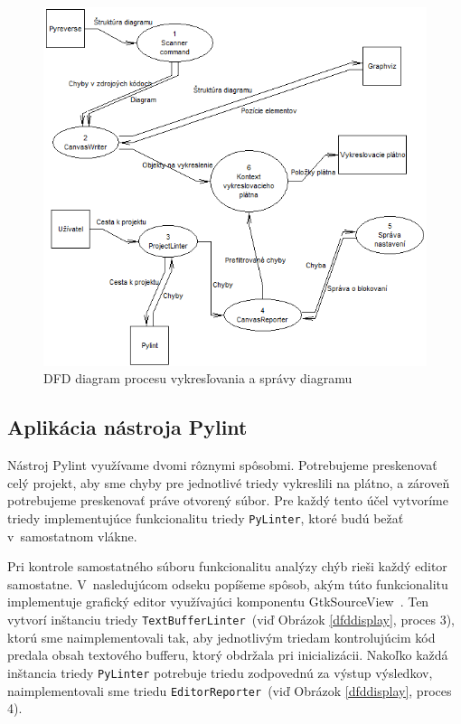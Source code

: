 \documentclass[11pt,oneside,final]{fithesis2}
\begin{document}
	\begin{figure}[htb]
	 \centering
	 \includegraphics[width=\textwidth]{images/dfd_diagram}
	 \caption{DFD diagram procesu vykresľovania a správy diagramu}
	 \label{dfdcanvas}
	\end{figure}

	
		\subsection{Aplikácia nástroja Pylint}

		Nástroj Pylint využívame dvomi rôznymi spôsobmi. Potrebujeme preskenovať celý projekt, aby sme chyby pre jednotlivé triedy vykreslili na plátno, a zároveň potrebujeme preskenovať práve otvorený súbor. Pre každý tento účel vytvoríme triedy implementujúce funkcionalitu triedy \texttt{PyLinter}, ktoré budú bežať v~samostatnom vlákne. 
		
		Pri kontrole samostatného súboru funkcionalitu analýzy chýb rieši každý editor samostatne. V~nasledujúcom odseku popíšeme spôsob, akým túto funkcionalitu implementuje grafický editor využívajúci komponentu GtkSourceView~\cite{gtksourceview}. Ten vytvorí inštanciu triedy \texttt{TextBufferLinter}~(viď Obrázok \ref{dfddisplay}, proces 3), ktorú sme naimplementovali tak, aby jednotlivým triedam kontrolujúcim kód predala obsah textového bufferu, ktorý obdržala pri inicializácii. Nakoľko každá inštancia triedy \texttt{PyLinter} potrebuje triedu zodpovednú za výstup výsledkov, naimplementovali sme triedu \texttt{EditorReporter}~(viď Obrázok \ref{dfddisplay}, proces 4).
		
\end{document}
